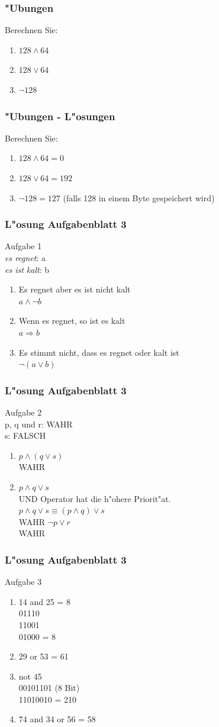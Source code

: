 \documentclass{beamer}
\begin{document}
\frame
{
	\frametitle{"Ubungen}
	Berechnen Sie:
	\begin{enumerate}
	\item $128 \land 64$
	\item $128 \lor 64$
	\item $\lnot 128$
	\end{enumerate}
}

\frame
{
	\frametitle{"Ubungen - L"osungen}
	Berechnen Sie:
	\begin{enumerate}
	\item $128 \land 64 = 0$
	\item $128 \lor 64 = 192$
	\item $\lnot 128 = 127$ (falls 128 in einem Byte gespeichert wird)
	\end{enumerate}
}

\frame
{
	\frametitle{L"osung Aufgabenblatt 3}
	Aufgabe 1\\
	\emph{es regnet}: a\\
	\emph{es ist kalt}: b
	\begin{enumerate}
	\item Es regnet aber es ist nicht kalt\\
	$a \land \lnot b$
	\item Wenn es regnet, so ist es kalt\\
	$a \Rightarrow b$	
	\item Es stimmt nicht, dass es regnet oder kalt ist\\
	$\lnot (a \lor b)$
	\end{enumerate}
}

\frame
{
	\frametitle{L"osung Aufgabenblatt 3}
	Aufgabe 2\\
	p, q und r: WAHR\\
	s: FALSCH\\
	\begin{enumerate}
	\item $p \land (q \lor s)$\\
	WAHR
	\item $p \land q \lor s$\\
	UND Operator hat die h"ohere Priorit"at.\\
	$p \land q \lor s \equiv (p \land q) \lor s$\\
	WAHR
	$\lnot p \lor r$\\
	WAHR
	\end{enumerate}
}

\frame
{
	\frametitle{L"osung Aufgabenblatt 3}
	Aufgabe 3\\
	\begin{enumerate}
	\item 14 and 25 = 8\\
	01110\\
	11001\\
	01000 = 8
	\item 29 or 53 = 61
	\item not 45\\
	00101101 (8 Bit)\\
	11010010 = 210
	\item 74 and 34 or 56 = 58
	\end{enumerate}
}
\end{document}
